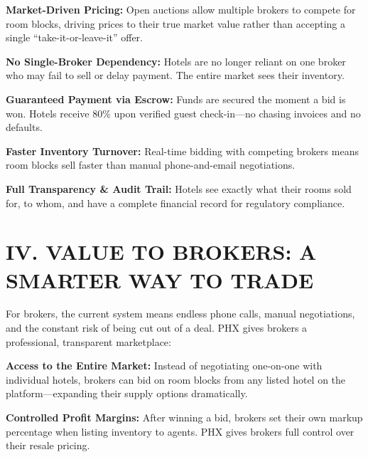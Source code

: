 \documentclass[11pt,a4paper]{article}
\begin{document}
\vspace{0.3cm}

\textbf{Market-Driven Pricing:} Open auctions allow multiple brokers to compete for room blocks, driving prices to their true market value rather than accepting a single ``take-it-or-leave-it'' offer.

\vspace{0.3cm}

\textbf{No Single-Broker Dependency:} Hotels are no longer reliant on one broker who may fail to sell or delay payment. The entire market sees their inventory.

\vspace{0.3cm}

\textbf{Guaranteed Payment via Escrow:} Funds are secured the moment a bid is won. Hotels receive 80\% upon verified guest check-in---no chasing invoices and no defaults.

\vspace{0.3cm}

\textbf{Faster Inventory Turnover:} Real-time bidding with competing brokers means room blocks sell faster than manual phone-and-email negotiations.

\vspace{0.3cm}

\textbf{Full Transparency \& Audit Trail:} Hotels see exactly what their rooms sold for, to whom, and have a complete financial record for regulatory compliance.

\vspace{0.3cm}

\section*{IV. VALUE TO BROKERS: A SMARTER WAY TO TRADE}

For brokers, the current system means endless phone calls, manual negotiations, and the constant risk of being cut out of a deal. PHX gives brokers a professional, transparent marketplace:

\vspace{0.3cm}

\textbf{Access to the Entire Market:} Instead of negotiating one-on-one with individual hotels, brokers can bid on room blocks from any listed hotel on the platform---expanding their supply options dramatically.

\vspace{0.3cm}

\textbf{Controlled Profit Margins:} After winning a bid, brokers set their own markup percentage when listing inventory to agents. PHX gives brokers full control over their resale pricing.
\end{document}
